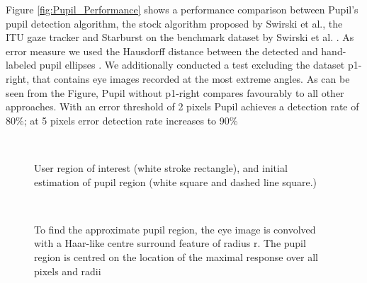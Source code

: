 Figure \ref{fig:Pupil_Performance} shows a performance comparison between Pupil’s pupil detection algorithm, the stock algorithm proposed by Swirski et al., the ITU gaze tracker and Starburst on the benchmark dataset by Swirski et al. \cite{swirski}. As error measure we used the Hausdorff distance between the detected and hand-labeled pupil ellipses \cite{swirski}. We additionally conducted a test excluding the dataset p1-right, that contains eye images recorded at the most extreme angles.
As can be seen from the Figure, Pupil without p1-right compares favourably to all other approaches. With an error threshold of 2 pixels Pupil achieves a detection rate of 80\%; at 5 pixels error detection rate increases to 90\%

\begin{figure}[]
\begin{dBox}
\centering
  \mbox{
   }
   \caption{ User region of interest (white stroke rectangle), and initial estimation of pupil region (white square and dashed line square.)
 \label{fig:Pupil Region} }   
\end{dBox}   
\end{figure}


\begin{figure}[]
\begin{dBox}
\centering
  \mbox{
   }
   \caption{ To find the approximate pupil region, the eye image is convolved with a Haar-like centre surround feature of radius r. The pupil region is centred on the location of the maximal response over all pixels and radii
 \label{fig:EstimationPupilFig} }   
\end{dBox}   
\end{figure}


